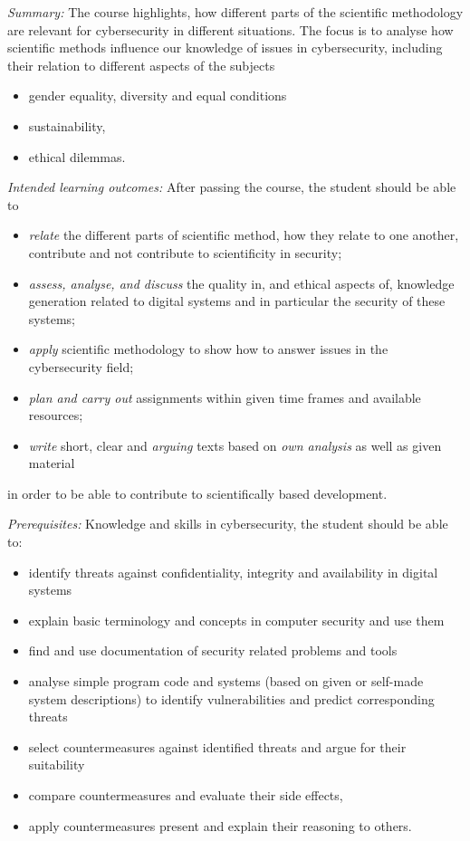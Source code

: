 \emph{Summary:}
The course highlights, how different parts of the scientific methodology are 
relevant for cybersecurity in different situations. The focus is to analyse how 
scientific methods influence our knowledge of issues in cybersecurity, 
including their relation to different aspects of the subjects
\begin{itemize}
  \item gender equality, diversity and equal conditions
  \item sustainability,
  \item ethical dilemmas.
\end{itemize}

\emph{Intended learning outcomes:}
After passing the course, the student should be able to
\begin{itemize}
  \item \emph{relate} the different parts of scientific method, how they relate 
    to one another, contribute and not contribute to scientificity in security;
  \item \emph{assess, analyse, and discuss} the quality in, and ethical aspects 
    of, knowledge generation related to digital systems and in particular the 
    security of these systems;
  \item \emph{apply} scientific methodology to show how to answer issues in the 
    cybersecurity field;
  \item \emph{plan and carry out} assignments within given time frames and 
    available resources;
  \item \emph{write} short, clear and \emph{arguing} texts based on \emph{own 
    analysis} as well as given material
\end{itemize}
in order to be able to contribute to scientifically based development.

\emph{Prerequisites:}
Knowledge and skills in cybersecurity, the student should be able to:
\begin{itemize}
  \item identify threats against confidentiality, integrity and availability in 
    digital systems
  \item explain basic terminology and concepts in computer security and use 
    them
  \item find and use documentation of security related problems and tools
  \item analyse simple program code and systems (based on given or self-made 
    system descriptions) to identify vulnerabilities and predict corresponding 
    threats
  \item select countermeasures against identified threats and argue for their 
    suitability
  \item compare countermeasures and evaluate their side effects,
  \item apply countermeasures present and explain their reasoning to others.
\end{itemize}

